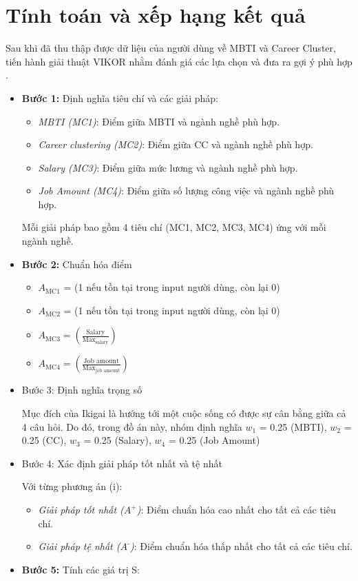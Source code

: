 \section{Tính toán và xếp hạng kết quả}
Sau khi đã thu thập được dữ liệu của người dùng về MBTI và Career Cluster, tiến hành giải thuật VIKOR nhằm đánh giá các lựa chọn và đưa ra gợi ý phù hợp \cite{prasenjit} \cite{qianglin}.

\begin{itemize}
    \item \textbf{Bước 1:} Định nghĩa tiêu chí và các giải pháp:
        \begin{itemize}
            \item \textit{MBTI (MC1)}: Điểm giữa MBTI và ngành nghề phù hợp.
            \item \textit{Career clustering (MC2)}: Điểm giữa CC và ngành nghề phù hợp.
            \item \textit{Salary (MC3)}: Điểm giữa mức lương và ngành nghề phù hợp.
            \item \textit{Job Amount (MC4)}: Điểm giữa số lượng công việc và ngành nghề phù hợp.
        \end{itemize}
        Mỗi giải pháp bao gồm 4 tiêu chí (MC1, MC2, MC3, MC4) ứng với mỗi ngành nghề.
    \item \textbf{Bước 2:} Chuẩn hóa điểm
        \begin{itemize}
            \item $A_{\text{MC1}}$ = (1 nếu tồn tại trong input người dùng, còn lại 0)
            \item $A_{\text{MC2}}$ = (1 nếu tồn tại trong input người dùng, còn lại 0)
            \item $A_{\text{MC3}} = \left(\frac{\text{Salary}}{\text{Max}_{\text{salary}}}\right)$
            \item $A_{\text{MC4}} = \left(\frac{\text{Job amount}}{\text{Max}_{\text{job amount}}}\right)$
        \end{itemize}
    \item Bước 3: Định nghĩa trọng số
    
    Mục đích của Ikigai là hướng tới một cuộc sống có được sự cân bằng giữa cả 4 câu hỏi. Do đó, trong đồ án này, nhóm định nghĩa 
    $w_{\text{1}}$ = 0.25 (MBTI), $w_{\text{2}}$ = 0.25 (CC), $w_{\text{3}}$ = 0.25 (Salary), $w_{\text{4}}$ = 0.25 (Job Amount)
    \item Bước 4: Xác định giải pháp tốt nhất và tệ nhất
    
    Với từng phương án (i):
        \begin{itemize}
            \item \textit{Giải pháp tốt nhất ($A^{\text{+}}$)}: Điểm chuẩn hóa cao nhất cho tất cả các tiêu chí.
            \item \textit{Giải pháp tệ nhất ($A^{\text{-}}$)}: Điểm chuẩn hóa thấp nhất cho tất cả các tiêu chí.
        \end{itemize}
    \item \textbf{Bước 5:} Tính các giá trị S:
    

\end{itemize}
